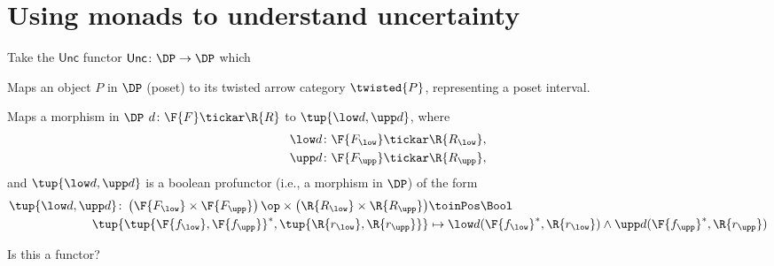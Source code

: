 \section{Using monads to understand uncertainty}

Take the $\mathsf{Unc}$ functor $\mathsf{Unc}\colon \DP\to \DP$ which 
\begin{compactenum}
    \item Maps an object $P$ in $\DP$ (poset) to its twisted arrow category $\twisted{P}$, representing a poset interval.
    \item Maps a morphism in $\DP$ $d\colon \F{F}\tickar \R{R}$ to $\tup{\low d,\upp d}$, where
    \begin{equation}
    \begin{aligned}
        \low d\colon \F{F_{\low}}&\tickar \R{R_{\low}},\\
        \upp d\colon \F{F_{\upp}}&\tickar \R{R_{\upp}},
    \end{aligned}
    \end{equation}
    and $\tup{\low d,\upp d}$ is a boolean profunctor (i.e., a morphism in $\DP$) of the form
    \begin{equation}
    \begin{aligned}
        \tup{\low d,\upp d}\colon \left(\F{F_{\low}}\times \F{F_{\upp}} \right)\op \times \left(\R{R_{\low}}\times \R{R_{\upp}} \right)&\toinPos \Bool\\
        \tup{\tup{\F{f_{\low}},\F{f_{\upp}}}^*,\tup{\R{r_{\low}},\R{r_{\upp}}}}&\mapsto \low d(\F{f_{\low}}^*,\R{r_{\low}})\wedge \upp d(\F{f_{\upp}}^*,\R{r_{\upp}})
    \end{aligned}
    \end{equation}
\end{compactenum}

Is this a functor?

